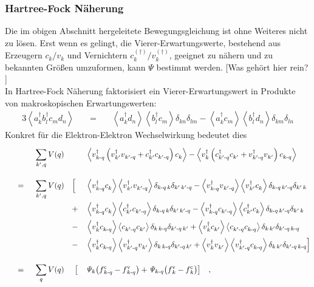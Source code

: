 \documentclass[a4paper,11pt, twoside]{article}
\newcommand{\ind}[2]{{_{#1}^{#2}}}
\newcommand{\+}{\dagger}
\newcommand{\bra}{\left \langle}
\newcommand{\ket}{\right \rangle}
\newcommand{\HF}[9]{ \bra #1 #4 \ket\bra #2 #3\ket \delta_{#5\,#8}\delta_{#6\,#7} #9 \bra #1 #3 \ket\bra #2 #4\ket \delta_{#5\, #7}\delta_{#6\, #8}}
\renewcommand{\'}{\tt\textquotesingle}
\renewcommand{\^}{\hat}
\renewcommand{\tt}{\text}
\renewcommand{\~}{\widetilde}
\begin{document}
\subsubsection{Hartree-Fock Näherung}
Die im obigen Abschnitt hergeleitete Bewegungsgleichung ist ohne Weiteres nicht zu lösen. Erst wenn es gelingt, die Vierer-Erwartungswerte, bestehend aus Erzeugern $c\ind{k}{}/v\ind{k}{}$ und Vernichtern $c\ind{k}{(\+)}/v\ind{k}{(\+)}$, geeignet zu nähern und zu bekannten Größen umzuformen, kann $\mathit{\Psi}$ bestimmt werden. [Was gehört hier rein? ]\\
In Hartree-Fock Näherung faktorisiert ein Vierer-Erwartungswert in Produkte von makroskopischen Erwartungswerten: 
\begin{alignat*}{3}
\bra a\ind{k}{\+}b\ind{l}{\+}c\ind{m}{}d\ind{n}{} \ket 
&& \ = \ &&  		\bra 		a\ind{k}{\+}d\ind{n}{}			\ket		\bra 		b\ind{l}{\+}c\ind{m}{}			\ket \delta_{kn}\delta_{lm}
- 							\bra 		a\ind{k}{\+}c\ind{m}{}		\ket		\bra 		b\ind{l}{\+} d\ind{n}{}		\ket \delta_{km}\delta_{ln}				%
\end{alignat*}
Konkret für die Elektron-Elektron Wechselwirkung bedeutet dies 
\begin{alignat*}{5}
& && &&  \sum_{k',q}^{} V(q) && &&		\bra  v\ind{k\tt -q}{\+}\left (v\ind{k'}{\+}v\ind{k'\tt -q}{}+c\ind{k'}{\+}c\ind{k'\tt-q}{}\right )c\ind{k}{} 		\ket  
-  	 					\bra  v\ind{k}{\+}\left (c\ind{k'\tt -q}{\+}c\ind{k'}{}+v\ind{k'\tt-q}{\+}v\ind{k'}{}\right )c\ind{k\tt -q}{}		\ket  \\[8pt]
%
%
& && \ =\ && \sum_{k',q}^{} V(q)  &&\Big[	  &&   \HF	{   v\ind{k\tt -q}{\+}   } {   v\ind{k'}{\+}   } {   v\ind{k'\tt-q}{}  } {  c\ind{k}{}  } {k\tt -q}  {k'}  {k'\tt-q}  {k} {-}\\
& &&  && && + && 	  	 \HF{   v\ind{k\tt -q}{\+}   } {   c\ind{k'}{\+}   } {   c\ind{k'\tt-q}{}  } {  c\ind{k}{}  } {k\tt -q}  {k'}  {k'\tt-q}  {k} {-} \\[1pt]
& &&  && && - && 	  	\HF{   v\ind{k}{\+}	    	} {   c\ind{k'\tt-q}{}  }  {   c\ind{k'}{} 		 } {  c\ind{k\tt -q}{}  } {k}  {k'\tt-q}  {k'}  {k\tt-q} {+} \\[1pt]
& &&  && && - && 	  	\HF{   v\ind{k}{\+}	    	} {   v\ind{k'\tt-q}{\+}  }  {   v\ind{k'}{} 		 } {  c\ind{k\tt -q}{}  } {k}  {k'\tt-q}  {k'}  {k\tt-q} {+} \Big] \\[8pt]
%
%
& && \ =\ &&  \sum_{q}^{} V(q)&&\ \big[ && \mathit{\Psi}_{k}\big(f\ind{k\tt-q}{\tt c}-f\ind{k\tt-q}{\tt v}\big) +\mathit{\Psi}_{k\tt-q}\big(f\ind{k}{\tt v}-f\ind{k}{\tt c}\big)\big]\quad , 
\end{alignat*}
\end{document}
